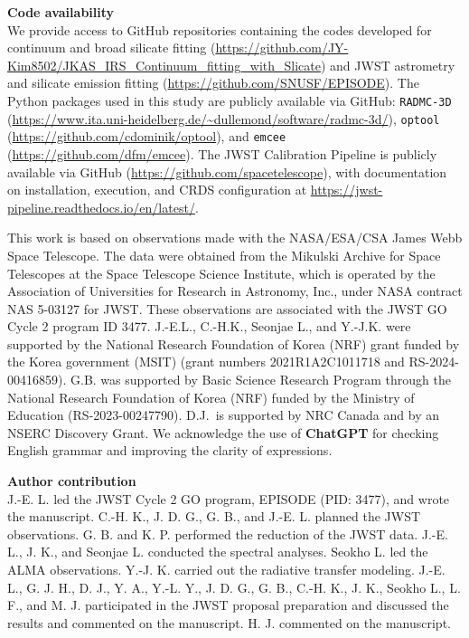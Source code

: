 \documentclass[pdflatex,sn-mathphys-num]{sn-jnl}
\theoremstyle{thmstyleone}
\theoremstyle{thmstyletwo}
\theoremstyle{thmstylethree}
\begin{document}
\begin{bibunit}
\vspace{0.3cm}
\noindent
{\bf Code availability}\\
We provide access to GitHub repositories containing the codes developed for continuum and broad silicate fitting (\url{https://github.com/JY-Kim8502/JKAS_IRS_Continuum_fitting_with_Slicate}) and JWST astrometry and silicate emission fitting (\url{https://github.com/SNUSF/EPISODE}).
The Python packages used in this study are publicly available via GitHub:
\texttt{RADMC-3D} (\url{https://www.ita.uni-heidelberg.de/~dullemond/software/radmc-3d/}),
\texttt{optool} (\url{https://github.com/cdominik/optool}), and
\texttt{emcee} (\url{https://github.com/dfm/emcee}).
The JWST Calibration Pipeline is publicly available via GitHub (\url{https://github.com/spacetelescope}), with documentation on installation, execution, and CRDS configuration at \url{https://jwst-pipeline.readthedocs.io/en/latest/}.
\renewcommand\refname{Methods References}
\putbib



This work is based on observations made with the NASA/ESA/CSA James Webb Space Telescope. The data were obtained from the Mikulski Archive for Space Telescopes at the Space Telescope Science Institute, which is operated by the Association of Universities for Research in Astronomy, Inc., under NASA contract NAS 5-03127 for JWST. These observations are associated with the JWST GO Cycle 2 program ID 3477. J.-E.L., C.-H.K., Seonjae L., and Y.-J.K. were supported by the National Research Foundation of Korea (NRF) grant funded by the Korea government (MSIT) (grant numbers 2021R1A2C1011718 and RS-2024-00416859).
G.B. was supported by Basic Science Research Program through the National Research Foundation of Korea (NRF) funded by the Ministry of Education (RS-2023-00247790).
D.J.\ is supported by NRC Canada and by an NSERC Discovery Grant.
We acknowledge the use of {\bf ChatGPT} for checking English grammar and improving the clarity of expressions.

\vspace{0.3cm}
\noindent
{\bf Author contribution}\\
J.-E. L. led the JWST Cycle 2 GO program, EPISODE (PID: 3477), and wrote the manuscript. C.-H. K., J. D. G., G. B., and J.-E. L. planned the JWST observations. G. B. and K. P. performed the reduction of the JWST data. J.-E. L., J. K., and Seonjae L. conducted the spectral analyses. Seokho L. led the ALMA observations. Y.-J. K. carried out the radiative transfer modeling. J.-E. L., G. J. H., D. J., Y. A., Y.-L. Y., J. D. G., G. B., C.-H. K., J. K., Seokho L., L. F., and M. J. participated in the JWST proposal preparation and discussed the results and commented on the manuscript. H. J. commented on the manuscript.


\end{bibunit}
\end{document}
